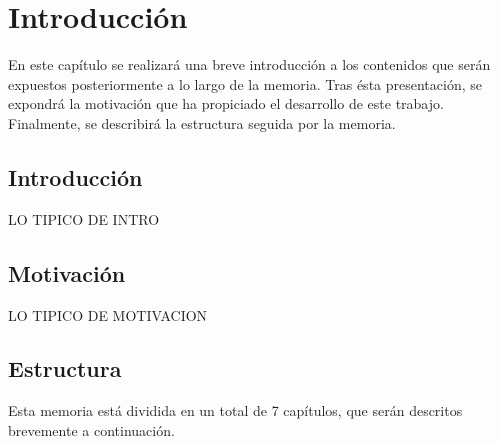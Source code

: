 \chapter{Introducción}

En este capítulo se realizará una breve introducción a los contenidos que serán expuestos posteriormente a lo largo de la memoria. Tras ésta presentación, se expondrá la motivación que ha propiciado el desarrollo de este trabajo. Finalmente, se describirá la estructura seguida por la memoria.

\section{Introducción}
LO TIPICO DE INTRO

\section{Motivación}
LO TIPICO DE MOTIVACION

\section{Estructura}


Esta memoria está dividida en un total de 7 capítulos, que serán descritos brevemente a continuación.

